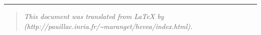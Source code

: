 \rule{}{}
\begin{quote}\em
\def\heveaurl{http://pauillac.inria.fr/\~{}maranget/hevea}%
\ifhtml
\def\footerurl#1#2{\@aelement{HREF="#1"}{#2}}%
\else
\def\footerurl#1#2{#2 (#1)}%
\fi
This document was translated from \LaTeX{} by
\footerurl{\heveaurl/index.html}{\hevea}.
\end{quote}

